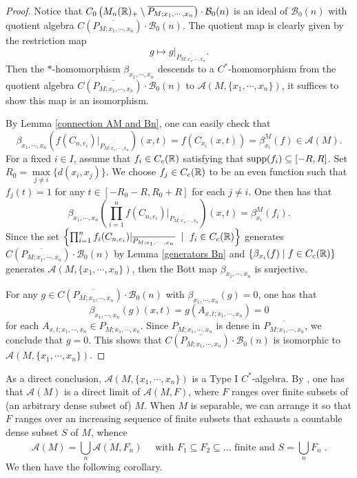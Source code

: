 \documentclass[11pt]{article}
\theoremstyle{definition}
\theoremstyle{plain}
\def\A{\mathcal A}\def\C{\mathcal C}\def\B{\mathcal B}\def\E{\mathcal E}\def\O{\mathcal O}\def\h{\mathfrak h}\def\K{\mathcal K}\def\F{\mathcal F}\def\P{\mathcal P}\def\L{\mathcal L}\def\R{\mathcal R}\def\Q{\mathcal Q}\def\H{\mathcal H}\def\S{\mathcal S}\def\N{\mathcal N}\def\U{\mathcal U}\def\V{\mathcal V}
\def\supp{\textup{supp}}
\begin{document}
\begin{proof}
Notice that $C_0 \left(M_n(\IR)_{+} \setminus \overline{P_{M;x_1, \cdots, x_n}} \right) \cdot \B_0(n)$ is an ideal of $\B_0(n)$ with quotient algebra $C(\overline{P_{M;x_1, \cdots, x_n}})\cdot\B_0(n)$. The quotient map is clearly given by the restriction map
$$g\mapsto g|_{\overline{P_{M;x_1, \cdots, x_n}}}.$$
Then the $*$-homomorphism $\beta_{x_1,\cdots,x_n}$ descends to a $C^*$-homomorphism from the quotient algebra $C\left(\overline{P_{M;x_1, \cdots,x_n}}\right)\cdot\B_0(n)$ to $\A(M,\{x_1,\cdots,x_n\})$, it suffices to show this map is an isomorphism.

By Lemma \ref{connection AM and Bn}, one can easily check that
$$\beta_{x_1,\cdots,x_n}\left(f(C_{n,e_i})|_{\overline{P_{M;x_1, \cdots, x_n}}}\right)(x,t)=f(C_{x_i}(x,t))=\beta^M_{x_i}(f)\in\A(M).$$
For a fixed $i\in I$, assume that $f_i\in C_c(\mathbb R)$ satisfying that $\supp(f_i)\subseteq[-R,R]$. Set $R_0=\max\limits_{j\ne i}\{d(x_i,x_j)\}$. We choose $f_j\in C_c(\mathbb R)$ to be an even function such that $f_j(t)=1$ for any $t\in [-R_0-R,R_0+R]$ for each $j\ne i$. One then has that
$$\beta_{x_1,\cdots,x_n}\left(\prod_{i=1}^nf(C_{n,e_i})|_{\overline{P_{M;x_1, \cdots, x_n}}}\right)(x,t)=\beta_{x_i}^M(f_i).$$
Since the set $\left\{\prod^n_{i=1}f_i(C_{n,e_i})|_{\overline{P_{M;x_1, \cdots, x_n}}}\ \mid\ f_i\in C_c(\mathbb R)\right\}$ generates $C\left(\overline{P_{M;x_1, \cdots,x_n}}\right)\cdot\B_0(n)$ by Lemma \ref{generators Bn} and $\left\{\beta_{x_i}(f)\mid f\in C_c(\mathbb R)\right\}$ generates $\A(M,\{x_1,\cdots,x_n\})$, then the Bott map $\beta_{x_1,\cdots,x_n}$ is surjective.

For any $g\in C\left(\overline{P_{M;x_1, \cdots,x_n}}\right)\cdot\B_0(n)$ with $\beta_{x_1,\cdots,x_n}(g)=0$, one has that
$$\beta_{x_1,\cdots,x_n}(g)(x,t)=g(A_{x,t; x_1, \cdots, x_n})=0$$
for each $A_{x,t;x_1,\cdots,x_n}\in P_{M;x_1, \cdots,x_n}$. Since $P_{M;x_1, \cdots,x_n}$ is dense in $\overline{P_{M;x_1, \cdots,x_n}}$, we conclude that $g=0$. This shows that $C\left(\overline{P_{M;x_1, \cdots,x_n}}\right)\cdot\B_0(n)$ is isomorphic to $\A(M,\{x_1,\cdots,x_n\})$.
\end{proof}

As a direct conclusion, $\A(M,\{x_1,\cdots,x_n\})$ is a Type I $C^*$-algebra. By \cite[Lemma 7.2]{GWY2018}, one has that $\A(M)$ is a direct limit of $\A(M,F)$, where $F$ ranges over finite subsets of (an arbitrary dense subset of) $M$. When $M$ is separable, we can arrange it so that $F$ ranges over an increasing sequence of finite subsets that exhausts a countable dense subset $S$ of $M$, whence
$$\A(M)=\overline{\bigcup_{n}\A(M,F_n)} \quad \text{ with } F_1 \subseteq F_2 \subseteq \ldots \text{ finite and } S = \bigcup_n F_n  \; .$$
We then have the following corollary. 
\end{document}
